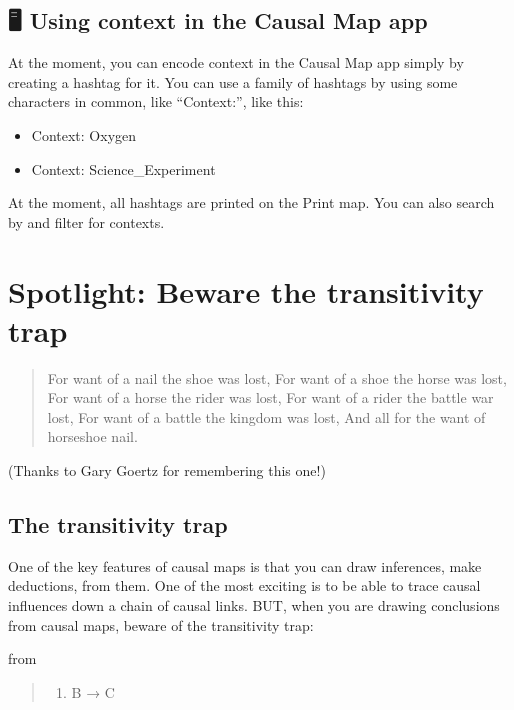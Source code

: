 \documentclass[
]{book}
\providecommand{\tightlist}{%
  \setlength{\itemsep}{0pt}\setlength{\parskip}{0pt}}
\begin{document}
\hypertarget{using-context-in-the-causal-map-app}{%
\section{🖥 Using context in the Causal Map app}\label{using-context-in-the-causal-map-app}}

At the moment, you can encode context in the Causal Map app simply by creating a hashtag for it. You can use a family of hashtags by using some characters in common, like ``Context:'', like this:

\begin{itemize}
\item
  Context: Oxygen
\item
  Context: Science\_Experiment
\end{itemize}

At the moment, all hashtags are printed on the Print map. You can also search by and filter for contexts.

\hypertarget{spotlight-beware-the-transitivity-trap}{%
\chapter{Spotlight: Beware the transitivity trap}\label{spotlight-beware-the-transitivity-trap}}

\begin{quote}
For want of a nail the shoe was lost,
For want of a shoe the horse was lost,
For want of a horse the rider was lost,
For want of a rider the battle war lost,
For want of a battle the kingdom was lost,
And all for the want of horseshoe nail.
\end{quote}

(Thanks to Gary Goertz for remembering this one!)

\hypertarget{the-transitivity-trap}{%
\section{The transitivity trap}\label{the-transitivity-trap}}

One of the key features of causal maps is that you can draw inferences, make deductions, from them. One of the most exciting is to be able to trace causal influences down a chain of causal links. BUT, when you are drawing conclusions from causal maps, beware of the transitivity trap:

from

\begin{quote}
\begin{enumerate}
\def\labelenumi{\arabic{enumi})}
\tightlist
\item
  B → C
\end{enumerate}
\end{quote}
\end{document}
